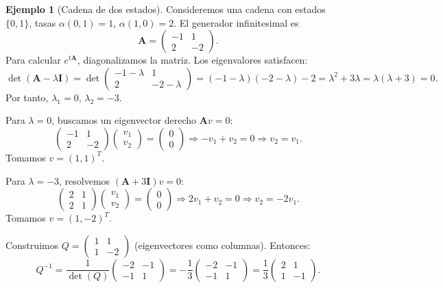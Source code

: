\documentclass{article}
\theoremstyle{plain}
\theoremstyle{definition}
\newtheorem{Ejemplo}[Teorema]{Ejemplo}
\newcommand{\A}{\mathbf{A}}
\newcommand{\I}{\mathbf{I}}
\begin{document}
\begin{Ejemplo}[Cadena de dos estados]
  Consideremos una cadena con estados $\{0,1\}$, tasas $\alpha(0,1) = 1$, $\alpha(1,0) = 2$. El generador infinitesimal es
  \[ \A = \begin{pmatrix}
    -1 & 1 \\
    2 & -2
  \end{pmatrix}. \]
  Para calcular $e^{t\A}$, diagonalizamos la matriz. Los eigenvalores satisfacen:
  \[ \det(\A - \lambda \I) = \det\begin{pmatrix}
    -1-\lambda & 1 \\
    2 & -2-\lambda
  \end{pmatrix} = (-1-\lambda)(-2-\lambda) - 2 = \lambda^2 + 3\lambda = \lambda(\lambda+3) = 0. \]
  Por tanto, $\lambda_1 = 0$, $\lambda_2 = -3$.
  
  Para $\lambda = 0$, buscamos un eigenvector derecho $\A v = 0$:
  \[ \begin{pmatrix}
    -1 & 1 \\
    2 & -2
  \end{pmatrix} \begin{pmatrix} v_1 \\ v_2 \end{pmatrix} = \begin{pmatrix} 0 \\ 0 \end{pmatrix} \Rightarrow -v_1 + v_2 = 0 \Rightarrow v_2 = v_1. \]
  Tomamos $v = (1,1)^T$.
  
  Para $\lambda = -3$, resolvemos $(\A + 3\I)v = 0$:
  \[ \begin{pmatrix}
    2 & 1 \\
    2 & 1
  \end{pmatrix} \begin{pmatrix} v_1 \\ v_2 \end{pmatrix} = \begin{pmatrix} 0 \\ 0 \end{pmatrix} \Rightarrow 2v_1 + v_2 = 0 \Rightarrow v_2 = -2v_1. \]
  Tomamos $v = (1,-2)^T$.
  
  Construimos $Q = \begin{pmatrix} 1 & 1 \\ 1 & -2 \end{pmatrix}$ (eigenvectores como columnas). Entonces:
  \[ Q^{-1} = \frac{1}{\det(Q)} \begin{pmatrix} -2 & -1 \\ -1 & 1 \end{pmatrix} = -\frac{1}{3} \begin{pmatrix} -2 & -1 \\ -1 & 1 \end{pmatrix} = \frac{1}{3}\begin{pmatrix} 2 & 1 \\ 1 & -1 \end{pmatrix}. \]
  

\end{Ejemplo}
\end{document}
